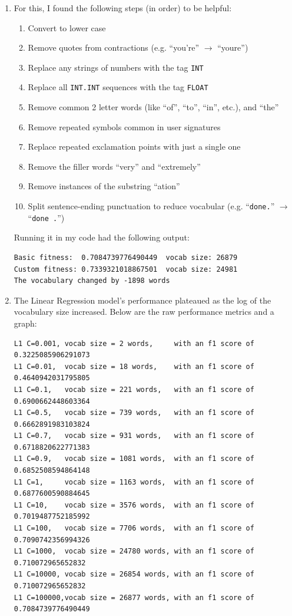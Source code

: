 \documentclass{article}
\begin{document}
\begin{enumerate}[start=1]
\item %
    For this, I found the following steps (in order) to be helpful:
    
    \begin{enumerate}[label=\arabic*.]
    \item Convert to lower case
    \item Remove quotes from contractions (e.g. ``you're'' $\rightarrow$ ``youre'')
    \item Replace any strings of numbers with the tag \texttt{INT}
    \item Replace all \texttt{INT.INT} sequences with the tag \texttt{FLOAT}
    \item Remove common 2 letter words (like ``of'', ``to'', ``in'', etc.), and ``the''
    \item Remove repeated symbols common in user signatures
    \item Replace repeated exclamation points with just a single one
    \item Remove the filler words ``very'' and ``extremely''
    \item Remove instances of the substring ``ation''
    \item Split sentence-ending punctuation to reduce vocabular (e.g. ``\texttt{done.}'' $\rightarrow$ ``\texttt{done .}'')
    \end{enumerate}
    
    Running it in my code had the following output:
    
    \begin{Verbatim}
Basic fitness:  0.7084739776490449  vocab size: 26879
Custom fitness: 0.7339321018867501  vocab size: 24981
The vocabulary changed by -1898 words
    \end{Verbatim}

\newpage

\item %
    The Linear Regression model's performance plateaued as the log of the vocabulary size increased. Below are the raw performance metrics and a graph:
    
    \begin{Verbatim}
L1 C=0.001, vocab size = 2 words,     with an f1 score of 0.3225085906291073
L1 C=0.01,  vocab size = 18 words,    with an f1 score of 0.4640942031795805
L1 C=0.1,   vocab size = 221 words,   with an f1 score of 0.6900662448603364
L1 C=0.5,   vocab size = 739 words,   with an f1 score of 0.6662891983103824
L1 C=0.7,   vocab size = 931 words,   with an f1 score of 0.6718820622771383
L1 C=0.9,   vocab size = 1081 words,  with an f1 score of 0.6852508594864148
L1 C=1,     vocab size = 1163 words,  with an f1 score of 0.6877600590884645
L1 C=10,    vocab size = 3576 words,  with an f1 score of 0.7019487752185992
L1 C=100,   vocab size = 7706 words,  with an f1 score of 0.7090742356994326
L1 C=1000,  vocab size = 24780 words, with an f1 score of 0.710072965652832
L1 C=10000, vocab size = 26854 words, with an f1 score of 0.710072965652832
L1 C=100000,vocab size = 26877 words, with an f1 score of 0.7084739776490449
    \end{Verbatim}
    

\end{enumerate}
\end{document}
